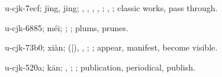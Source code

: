 \begin{multicols}{2}
{\cjkgGlue{}u-cjk-7ecf; jīng, jing; \cjkgGlue{}\cjkgGlue{}\cjkgGlue{}, \cjkgGlue{}\cjkgGlue{}\cjkgGlue{}, \cjkgGlue{}, \cjkgGlue{}\cjkgGlue{}\cjkgGlue{}, \cjkgGlue{}; \cjkgGlue{}, \cjkgGlue{}; classic works, pass through.

\cjkgGlue{}u-cjk-6885; méi; \cjkgGlue{}; \cjkgGlue{}; plums, prunes.

\cjkgGlue{}u-cjk-73b0; xiàn; \cjkgGlue{}\cjkgGlue{}(\cjkgGlue{}|\cjkgGlue{}), \cjkgGlue{}, \cjkgGlue{}\cjkgGlue{}\cjkgGlue{}; \cjkgGlue{}; appear, manifest, become visible.

\cjkgGlue{}u-cjk-520a; kān; \cjkgGlue{}, \cjkgGlue{}; \cjkgGlue{}; publication, periodical, publish.

}
\end{multicols}
